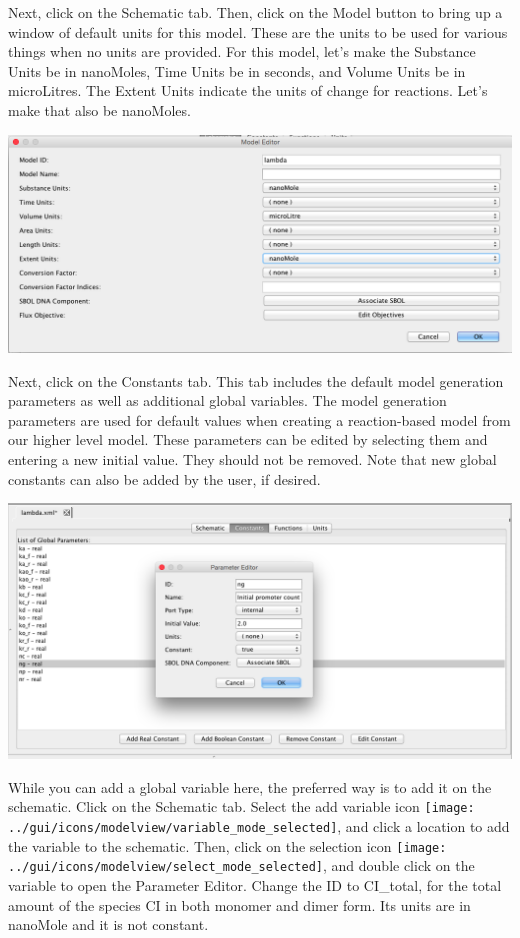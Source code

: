 \documentclass[titlepage,11pt]{article}
\begin{document}
Next, click on the Schematic tab.  Then, click on the Model button to bring up a window of default units for this model.  These are the units to be used for various things when no units are provided.  For this model, let's make the Substance Units be in nanoMoles, Time Units be in seconds, and Volume Units be in microLitres.  The Extent Units indicate the units of change for reactions.  Let's make that also be nanoMoles.

\begin{center}
\includegraphics[width=160mm]{screenshots/ModelUnits}
\end{center}

Next, click on the Constants tab.  This tab includes the default model generation parameters as well as additional global variables.  The model generation parameters are used for default values when creating a reaction-based model from our higher level model.  These parameters can be edited by selecting them and entering a new initial value.  They should not be removed.  Note that new global constants can also be added by the user, if desired.

\begin{center}
\includegraphics[width=160mm]{screenshots/GCMparam}
\end{center}

While you can add a global variable here, the preferred way is to add it on the schematic.  Click on the Schematic tab.  Select the add variable icon \texttt{[image: ../gui/icons/modelview/variable\_mode\_selected]}, and click a location to add the variable to the schematic.  Then, click on the selection icon 
\texttt{[image: ../gui/icons/modelview/select\_mode\_selected]}, and double click on the variable to open the Parameter Editor.  Change the ID to CI\_total, for the total amount of the species CI in both monomer and dimer form.  Its units are in nanoMole and it is not constant.  
\end{document}
